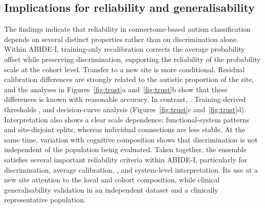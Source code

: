 \subsection{Implications for reliability and generalisability}
\label{subsec:trustworthiness}

The findings indicate that reliability in connectome-based autism classification depends on several distinct properties rather than on discrimination alone. Within ABIDE-I, training-only recalibration corrects the average probability offset while preserving discrimination, supporting the reliability of the probability scale at the cohort level. Transfer to a new site is more conditional. Residual calibration differences are strongly related to the autistic proportion of the site, and the analyses in Figures~\ref{fig:trust}a and~\ref{fig:trust}b show that these differences  is known with reasonable accuracy. In contrast, . Training-derived thresholds , and decision-curve analysis (Figures~\ref{fig:trust}c and~\ref{fig:trust}d). Interpretation also shows a clear scale dependence: functional-system patterns  and site-disjoint splits, whereas individual connections are less stable. At the same time, variation with cognitive composition shows that discrimination is not independent of the population being evaluated. Taken together, the ensemble satisfies several important reliability criteria within ABIDE-I, particularly for discrimination, average calibration, , and system-level interpretation. Its use at a new site  attention to the local  and cohort composition, while clinical generalisability  validation in an independent dataset and a clinically representative population.

